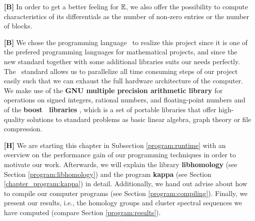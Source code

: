 {\bf [B]} In order to get a better feeling for $\mathbb E$, we also offer the possibility to compute characteristics of its differentials as the number of non-zero entries or the number of blocks.

{\bf [B]} We chose the programming language \cppeleven\ to realize this project since it is one of the prefered programming languages for mathematical projects, and since the new standard together with some additional libraries suits our needs perfectly.
The \cppeleven\ standard allows us to parallelize all time consuming steps of our project easily
such that we can exhaust the full hardware architecture of the computer.
We make use of the {\bf GNU multiple precision arithmetic library} \cite{GMP} for operations on signed integers, rational numbers, and floating-point numbers and
of the {\bf boost \cpp\ libraries} \cite{boost}, which is a set of portable libraries that offer high-quality solutions to standard problems as basic linear algebra, graph theory or file compression.

{\bf [H]} We are starting this chapter in Subsection \ref{program:runtime} with an overview on the performance gain of our programming techniques in order to motivate our work.
Afterwards, we will explain the library {\bf libhomology} (see Section \ref{program:libhomology}) and the program {\bf kappa} (see Section \ref{chapter_program:kappa}) in detail.
Additionally, we hand out advise about how to compile our computer programs (see Section \ref{program:compiling}).
Finally, we present our results, i.e., the homology groups and cluster spectral sequences we have computed (compare Section \ref{program:results}).







\nocite{Austern2003}
\nocite{Josuttis2012}
\nocite{Stroustrup2013}
